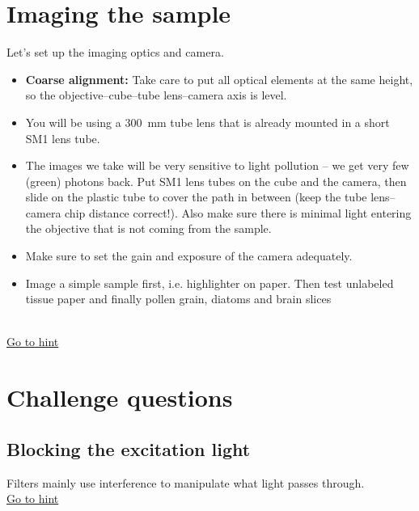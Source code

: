 \documentclass[a4paper]{report}
\begin{document}
\section{Imaging the sample}
Let's set up the imaging optics and camera.
   \begin{itemize}
       \item \textbf{Coarse alignment:} Take care to put all optical elements at the same height, so the objective--cube--tube lens--camera axis is level.
       \item You will be using a 300~mm tube lens that is already mounted in a short SM1 lens tube.
       \item The images we take will be very sensitive to light pollution -- we get very few (green) photons back. Put SM1 lens tubes on the cube and the camera, then slide on the plastic tube to cover the path in between (keep the tube lens--camera chip distance correct!). Also make sure there is minimal light entering the objective that is not coming from the sample.
       \item Make sure to set the gain and exposure of the camera adequately.
       \item Image a simple sample first, i.e. highlighter on paper. Then test unlabeled tissue paper and finally pollen grain, diatoms and brain slices
   \end{itemize}
\hypertarget{hintBack-imaging}{}
\\
\hyperlink{hintTo-imaging}{Go to hint}


\section{Challenge questions}
\hypertarget{hintBack-challenge}{}
\subsection{Blocking the excitation light}
   Filters mainly use interference to manipulate what light passes through.
\\
\hyperlink{hintTo-challenge}{Go to hint}
\clearpage
\end{document}

